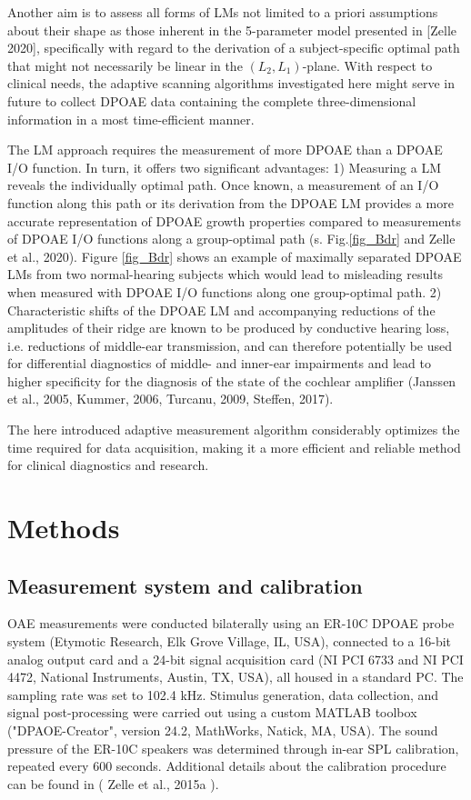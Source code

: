 \documentclass[journal,twoside,web]{ieeecolor2}
\begin{document}
Another aim is to assess all forms of LMs not limited to a priori assumptions about their shape as those inherent in the 5-parameter model presented in [Zelle 2020], specifically with regard to the derivation of a subject-specific optimal path that might not necessarily be linear in the $(L_2, L_1)$-plane.
With respect to clinical needs, the adaptive scanning algorithms investigated here might serve in future to collect DPOAE data containing the complete three-dimensional information in a most time-efficient manner.

The LM approach requires the measurement of more DPOAE than a DPOAE I/O function.
In turn, it offers two significant advantages: 1) Measuring a LM reveals the individually optimal path.
Once known, a measurement of an I/O function along this path or its derivation from the DPOAE LM provides a more accurate representation of DPOAE growth properties compared to measurements of DPOAE I/O functions along a group-optimal path (s. Fig.\ref{fig_Bdr} and Zelle et al., 2020).
Figure \ref{fig_Bdr} shows an example of maximally separated DPOAE LMs from two normal-hearing subjects which would lead to misleading results when measured with DPOAE I/O functions along one group-optimal path.
2) Characteristic shifts of the DPOAE LM and accompanying reductions of the amplitudes of their ridge are known to be produced by conductive hearing loss, i.e.
reductions of middle-ear transmission, and can therefore potentially be used for differential diagnostics of middle- and inner-ear impairments and lead to higher specificity for the diagnosis of the state of the cochlear amplifier (Janssen et al., 2005, Kummer, 2006, Turcanu, 2009, Steffen, 2017).

The here introduced adaptive measurement algorithm considerably optimizes the time required for data acquisition, making it a more efficient and reliable method for clinical diagnostics and research.

\section{Methods}
\subsection{Measurement system and calibration}
OAE measurements were conducted bilaterally using an ER-10C DPOAE probe system (Etymotic Research, Elk Grove Village, IL, USA), connected to a 16-bit analog output card and a 24-bit signal acquisition card (NI PCI 6733 and NI PCI 4472, National Instruments, Austin, TX, USA), all housed in a standard PC.
The sampling rate was set to 102.4 kHz.
Stimulus generation, data collection, and signal post-processing were carried out using a custom MATLAB toolbox ("DPAOE-Creator", version 24.2, MathWorks, Natick, MA, USA).
The sound pressure of the ER-10C speakers was determined through in-ear SPL calibration, repeated every 600 seconds.
Additional details about the calibration procedure can be found in  ( Zelle et al., 2015a ).
\end{document}
